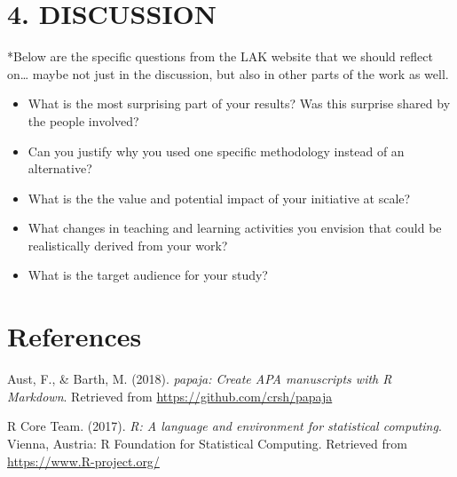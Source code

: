 \documentclass[]{apa6}
\theoremstyle{definition}
\theoremstyle{definition}
\theoremstyle{definition}
\theoremstyle{remark}
\begin{document}
\section{4. DISCUSSION}\label{discussion}

*Below are the specific questions from the LAK website that we should
reflect on\ldots{} maybe not just in the discussion, but also in other
parts of the work as well.

\begin{itemize}
\item
  What is the most surprising part of your results? Was this surprise
  shared by the people involved?
\item
  Can you justify why you used one specific methodology instead of an
  alternative?
\item
  What is the the value and potential impact of your initiative at
  scale?
\item
  What changes in teaching and learning activities you envision that
  could be realistically derived from your work?
\item
  What is the target audience for your study?
\end{itemize}

\newpage

\section{References}\label{references}

\begingroup
\setlength{\parindent}{-0.5in} \setlength{\leftskip}{0.5in}

\hypertarget{refs}{}
\hypertarget{ref-R-papaja}{}
Aust, F., \& Barth, M. (2018). \emph{papaja: Create APA manuscripts with
R Markdown}. Retrieved from \url{https://github.com/crsh/papaja}

\hypertarget{ref-R-base}{}
R Core Team. (2017). \emph{R: A language and environment for statistical
computing}. Vienna, Austria: R Foundation for Statistical Computing.
Retrieved from \url{https://www.R-project.org/}

\endgroup
\end{document}
